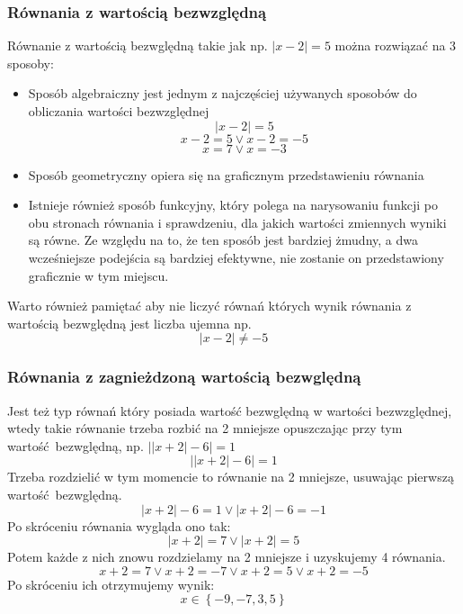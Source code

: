 \documentclass[12pt, a4paper]{article}
\begin{document}
\subsubsection{Równania z wartością bezwzględną}
Równanie z wartością bezwględną takie jak np. $\left|x-2\right|=5$ można rozwiązać na 3 sposoby:
\begin{itemize}
  \item Sposób algebraiczny jest jednym z najczęściej używanych sposobów do obliczania wartości bezwzględnej
      $$\left|x-2\right|=5$$
      $$x-2=5 \vee x-2=-5$$
      $$x=7\vee x=-3$$
  \item Sposób geometryczny opiera się na graficznym przedstawieniu równania
    \begin{center}
    \end{center}
  \item Istnieje również sposób funkcyjny, który polega na narysowaniu funkcji po
        obu stronach równania i sprawdzeniu, dla jakich wartości zmiennych wyniki są
        równe. Ze względu na to, że ten sposób jest bardziej żmudny, a dwa wcześniejsze
        podejścia są bardziej efektywne, nie zostanie on przedstawiony graficznie w tym miejscu.
\end{itemize}
Warto również pamiętać aby nie liczyć równań których wynik równania z wartością bezwględną jest liczba ujemna np.
$$\left|x-2\right|\neq-5$$
\subsubsection{Równania z zagnieżdzoną wartością bezwględną}
Jest też typ równań który posiada wartość bezwględną w wartości bezwzględnej,
wtedy takie równanie trzeba rozbić na 2 mniejsze opuszczając przy tym
wartość bezwględną, np. $\left|\left|x+2\right|-6\right| = 1$
$$\left|\left|x+2\right|-6\right|=1$$
Trzeba rozdzielić w tym momencie to równanie na 2 mniejsze, usuwając pierwszą wartość bezwględną.
$$\left|x+2\right|-6=1 \vee \left|x+2\right|-6=-1$$
Po skróceniu równania wygląda ono tak:
$$\left|x+2\right|=7 \vee \left|x+2\right|=5$$
Potem każde z nich znowu rozdzielamy na 2 mniejsze i uzyskujemy 4 równania.
$$x+2=7 \vee x+2=-7 \vee x+2=5 \vee x+2=-5$$
Po skróceniu ich otrzymujemy wynik:
$$x \in \left\{ -9, -7, 3, 5\right\}$$
\end{document}
